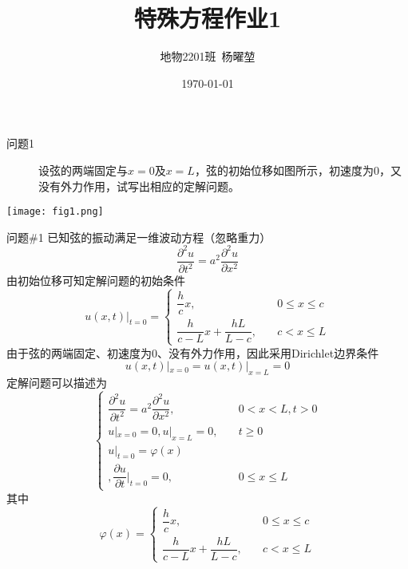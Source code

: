 \documentclass[12pt]{ctexart}
\title{特殊方程作业1}
\author{地物2201班\ 杨曜堃}
\date{\today}
\begin{document}
    \markboth{\theauthor}{\thetitle}
    \maketitle
    \begin{description}
        \item[问题1] 设弦的两端固定与$x=0$及$x=L$，弦的初始位移如图所示，初速度为0，又没有外力作用，试写出相应的定解问题。
    \end{description}

    \begin{center}
        \texttt{[image: fig1.png]}
    \end{center}
    
    \begin{problem}{问题\#1}
        已知弦的振动满足一维波动方程（忽略重力）
        $$
        \dfrac{\partial^2u}{\partial t^2}=a^2\dfrac{\partial^2u}{\partial x^2}
        $$
        由初始位移可知定解问题的初始条件
        $$
        u(x,t)|_{t=0}=
            \begin{cases}
                \dfrac{h}{c}x, & \quad 0\leqslant x\leqslant c\\
                \dfrac{h}{c-L}x+\dfrac{hL}{L-c}, & \quad c<x\leqslant L
            \end{cases} 
        $$
        由于弦的两端固定、初速度为0、没有外力作用，因此采用Dirichlet边界条件
        $$
            u(x,t)|_{x=0}=u(x,t)|_{x=L}=0
        $$
        定解问题可以描述为
        $$
            \begin{cases}
                \dfrac{\partial^2u}{\partial t^2}=a^2\dfrac{\partial^2u}{\partial x^2},&\quad 0<x<L,t>0\\
                u|_{x=0}=0,u|_{x=L}=0,&\quad t\geqslant 0\\
                u|_{t=0}=\varphi(x)\\,\dfrac{\partial u}{\partial t}|_{t=0}=0,&\quad 0\leqslant x\leqslant L
            \end{cases}
        $$
        其中
        $$
        \varphi(x)=
            \begin{cases}
                \dfrac{h}{c}x, & \quad 0\leqslant x\leqslant c\\
                \dfrac{h}{c-L}x+\dfrac{hL}{L-c}, & \quad c<x\leqslant L
            \end{cases} 
        $$
    \end{problem}
\end{document}
